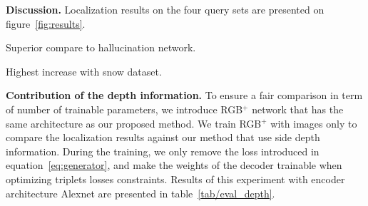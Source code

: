 \noindent\textbf{Discussion.} Localization results on the four query sets are presented on figure~\ref{fig:results}. 

Superior compare to hallucination network.

Highest increase with snow dataset.


\noindent\textbf{Contribution of the depth information.} To ensure a fair comparison in term of number of trainable parameters, we introduce RGB$^+$ network that has the same architecture as our proposed method. We train RGB$^+$ with images only to compare the localization results against our method that use side depth information. During the training, we only remove the loss introduced in equation~\ref{eq:generator}, and make the weights of the decoder trainable when optimizing triplets losses constraints. Results of this experiment with encoder architecture Alexnet are presented in table~\ref{tab/eval_depth}.

